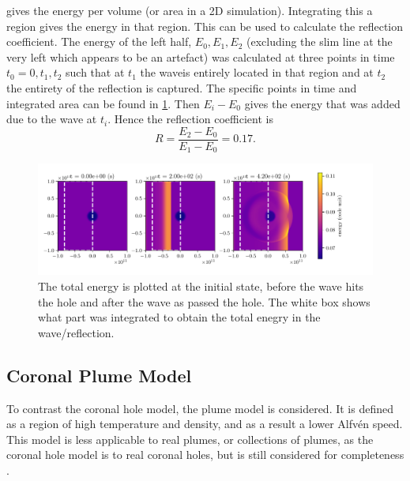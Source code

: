 \documentclass[a4paper]{article}
\numberwithin{figure}{section}
\numberwithin{equation}{section}
\begin{document}
 gives the energy per volume (or area in a 2D simulation). 
Integrating this a region gives the energy in that region. 
This can be used to calculate the reflection coefficient.
The energy of the left half, $E_0, E_1, E_2$ (excluding the slim line at the very left which appears to be an artefact) was calculated at three points in time $t_0 = 0, t_1, t_2$ such that at $t_1$ the waveis entirely located in that region and at $t_2$ the entirety of the reflection is captured. 
The specific points in time and integrated area can be found in \cref{fig:reflection_coefficient}.
Then $E_i - E_0$ gives the energy that was added due to the wave at $t_i$. Hence the reflection coefficient is \[
	R = \frac{E_2 - E_0}{E_1 - E_0} = 0.17
.\] 
\begin{figure}[ht]
	\centering
	\includegraphics[width=\textwidth]{figures/calculation_reflection.pdf}
	\caption{The total energy is plotted at the initial state, before the wave hits the hole and after the wave as passed the hole. The white box shows what part was integrated to obtain the total enegry in the wave/reflection.}
	\label{fig:reflection_coefficient}
\end{figure}

\subsection{Coronal Plume Model}\label{sec:coronal_plume_model} 
To contrast the coronal hole model, the plume model is considered. 
It is defined as a region of high temperature and density, and as a result a lower Alfv\'en speed.
This model is less applicable to real plumes, or collections of plumes, as the coronal hole model is to real coronal holes, but is still considered for completeness \cite{afanasyev2018propagation}. 
\end{document}
